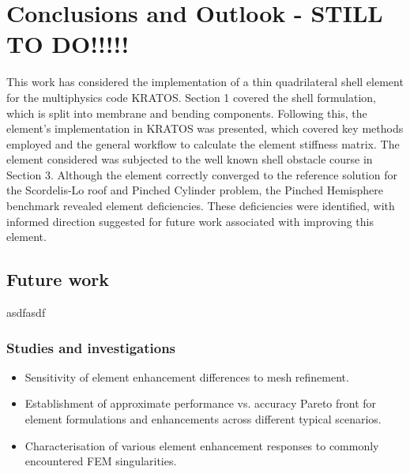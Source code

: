 
\chapter{Conclusions and Outlook - STILL TO DO!!!!!}
\label{chap:conclusions}
\renewcommand{\Thema}{Conclusion}

This work has considered the implementation of a thin quadrilateral shell element for the multiphysics code KRATOS. Section 1 covered the shell formulation, which is split into membrane and bending components. Following this, the element's implementation in KRATOS was presented, which covered key methods employed and the general workflow to calculate the element stiffness matrix. The element considered was subjected to the well known shell obstacle course in Section 3. Although the element correctly converged to the reference solution for the Scordelis-Lo roof and Pinched Cylinder problem, the Pinched Hemisphere benchmark revealed element deficiencies. These deficiencies were identified, with informed direction suggested  for future work associated with improving this element. 

\section{Future work}
asdfasdf
\subsection{Studies and investigations}
\begin{itemize}
	\item Sensitivity of element enhancement differences to mesh refinement.
	\item Establishment of approximate performance vs. accuracy Pareto front for element formulations and enhancements across different typical scenarios.
	\item Characterisation of various element enhancement responses to commonly encountered FEM singularities.
\end{itemize}


